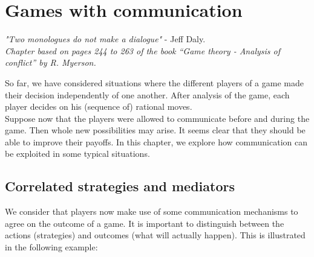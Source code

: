 \ifx \globalmark \undefined %
	
\else 	
\fi


\chapter{Games with communication}
{\large{\itshape
"Two monologues do not make a dialogue"} - Jeff Daly.\\
}
\label{chap:Cor}
  {\small{\itshape
Chapter based on pages 244 to 263 of the book  ``Game theory - Analysis of conflict'' by R. Myerson.}\\
}


So far, we have considered situations where the different players of a game made their decision independently of one another. After analysis of the game, each player decides on his (sequence of) rational moves.\\
Suppose now that the players were allowed to communicate before and during the game. Then whole new possibilities may arise. It seems clear that they should be able to improve their payoffs. In this chapter, we explore how communication can be exploited in some typical situations.

\section{Correlated strategies and mediators}

We consider that players now  make use of some communication mechanisms to agree on the outcome of a game. It is important to distinguish between the actions (strategies) and outcomes (what will actually happen). This is illustrated in the following example: 

